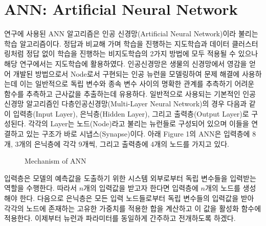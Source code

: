 \documentclass{article}
\begin{document}
\section{ANN: Artificial Neural Network}
연구에 사용된 ANN 알고리즘은 인공 신경망(Artificial Neural Network)이라 불리는 학습 알고리즘이다. 정답과 비교해 가며 학습을 진행하는 지도학습과 데이터 클러스터링처럼 정답 없이 학습을 진행하는 비지도학습의 2가지 방법에 모두 적용될 수 있으나 해당 연구에서는 지도학습에 활용하였다. 인공신경망은 생물의 신경망에서 영감을 얻어 개발된 방법으로서 Node로서 구현되는 인공 뉴런을 모델링하여 문제 해결에 사용하는데 이는 일반적으로 독립 변수와 종속 변수 사이의 명확한 관계를 추측하기 어려운 함수를 추측하고 근사값을 추출하는데 유용하다. \newline
일반적으로 사용되는 기본적인 인공신경망 알고리즘인 다층인공신경망(Multi-Layer Neural Network)의 경우 다음과 같이 입력층(Input Layer), 은닉층(Hidden Layer), 그리고 출력층(Output Layer)로 구성된다. 각각의 Layer는 노드(Node)라고 불리는 뉴런들로 구성되어 있으며 이들을 연결하고 있는 구조가 바로 시냅스(Synapse)이다. 아래 Figure 1의 ANN은 입력층에 8개, 3개의 은닉층에 각각 9개씩, 그리고 출력층에 4개의 노드를 가지고 있다.

\begin{figure}[h]
\centering
{}
\caption{Mechanism of ANN}
\label{fig_1}
\end{figure}

입력층은 모델의 예측값을 도출하기 위한 시스템 외부로부터 독립 변수들을 입력받는 역할을 수행한다. 따라서 $n$개의 입력값을 받고자 한다면 입력층에 $n$개의 노드를 생성해야 한다. 다음으로 은닉층은 모든 입력 노드들로부터 독립 변수들의 입력값을 받아 각각의 노드에 존재하는 고유한 가중치를 적용한 합을 계산하고 이 값을 활성화 함수에 적용한다. 이제부터 뉴런과 파라미터를 동일하게 간주하고 전개하도록 하겠다.
\end{document}
